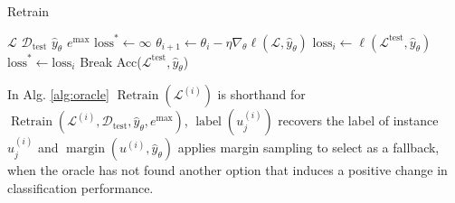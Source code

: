 \documentclass[]{article}
\begin{document}
\begin{minipage}{0.5\linewidth}
	\begin{algorithm}[H]
		\caption{Retrain}\label{alg:retrain}
		\begin{algorithmic}[1]
			\Require $\mathcal{L}$ 
			\Require $\mathcal{D}_\text{test}$ 
			\Require $\hat y_\theta$ 
			\Require $e^\text{max}$ 
			\State $\text{loss}^* \gets \infty$
			\State $\theta_{i+1} \gets \theta_i - \eta \nabla_\theta \ell(\mathcal{L}, \hat y_{\theta})$
			\State $\text{loss}_i \gets \ell(\mathcal{L}^\text{test}, \hat y_{\theta})$
			\State $\text{loss}^* \gets \text{loss}_i$
			\Else
			\State Break
			\EndIf
			\EndFor
			\State
			\Return Acc($\mathcal{L}^\text{test}, \hat y_{\theta}$)
		\end{algorithmic}
	\end{algorithm}
	In Alg. \ref{alg:oracle} $\operatorname{Retrain}(\mathcal{L}^{(i)})$ is shorthand for $\operatorname{Retrain}(\mathcal{L}^{(i)}, \mathcal{D}_\text{test}, \hat y_\theta, e^\text{max})$, $\operatorname{label}(u^{(i)}_{j})$ recovers the label of instance $u^{(i)}_{j}$ and $\operatorname{margin}(u^{(i)}, \hat y_\theta)$ applies margin sampling to select as a fallback, when the oracle has not found another option that induces a positive change in classification performance.
\end{minipage}


\end{document}
